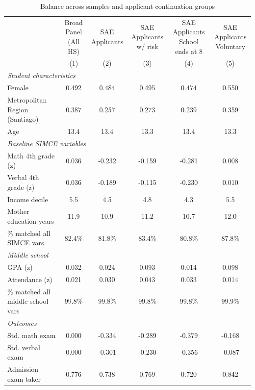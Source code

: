 \begin{table}[H]
\centering
\caption{Balance across samples and applicant continuation groups}
\label{tab:balance_samples_continuation}
\scriptsize
\setlength{\tabcolsep}{4pt}
\begin{tabular}{@{}lccccc@{}}
\toprule
 & \shortstack{Broad Panel\\(All HS)} & \shortstack{SAE\\Applicants} & \shortstack{SAE Applicants\\w/ risk} & \shortstack{SAE Applicants\\School ends at 8} & \shortstack{SAE Applicants\\Voluntary} \\
 & (1) & (2) & (3) & (4) & (5) \\
\midrule
\multicolumn{6}{l}{\textit{Student characteristics}} \\[2pt]
Female & 0.492 & 0.484 & 0.495 & 0.474 & 0.550 \\
Metropolitan Region (Santiago) & 0.387 & 0.257 & 0.273 & 0.239 & 0.359 \\
Age & 13.4 & 13.4 & 13.3 & 13.4 & 13.3 \\
\midrule
\multicolumn{6}{l}{\textit{Baseline SIMCE variables}} \\[2pt]
Math 4th grade (z) & 0.036 & -0.232 & -0.159 & -0.281 & 0.008 \\
Verbal 4th grade (z) & 0.036 & -0.189 & -0.115 & -0.230 & 0.010 \\
Income decile & 5.5 & 4.5 & 4.8 & 4.3 & 5.5 \\
Mother education years & 11.9 & 10.9 & 11.2 & 10.7 & 12.0 \\
\% matched all SIMCE vars & 82.4\% & 81.8\% & 83.4\% & 80.8\% & 87.8\% \\
\midrule
\multicolumn{6}{l}{\textit{Middle school}} \\[2pt]
GPA (z) & 0.032 & 0.024 & 0.093 & 0.014 & 0.098 \\
Attendance (z) & 0.021 & 0.030 & 0.043 & 0.033 & 0.014 \\
\% matched all middle-school vars & 99.8\% & 99.8\% & 99.8\% & 99.8\% & 99.9\% \\
\midrule
\multicolumn{6}{l}{\textit{Outcomes}} \\[2pt]
Std. math exam & 0.000 & -0.334 & -0.289 & -0.379 & -0.168 \\
Std. verbal exam & 0.000 & -0.301 & -0.230 & -0.356 & -0.087 \\
Admission exam taker & 0.776 & 0.738 & 0.769 & 0.720 & 0.842 \\

\end{tabular}
\end{table}
